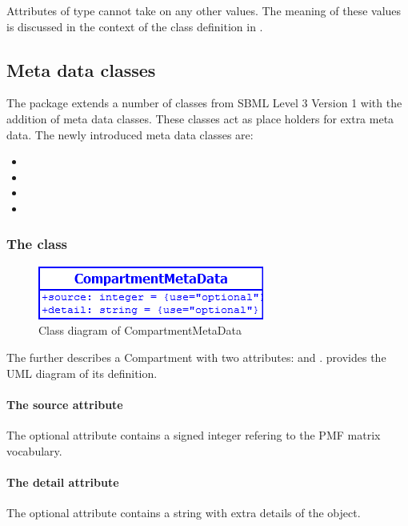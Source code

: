 Attributes of type  cannot take on any other values. The
meaning of these values is discussed in the context of the \RuleMetaData class
definition in .

\subsection{Meta data classes}
The \Pmf package extends a number of classes from SBML Level 3 Version 1 with
the addition of meta data classes. These classes act as place holders for extra
meta data. The newly introduced meta data classes are:
\begin{itemize}
	\item \CompartmentMetaData
	\item \ParameterMetaData
	\item \RuleMetaData
	\item \SpeciesMetaData
\end{itemize}


\subsubsection{The  class}
\begin{figure}
	\includegraphics[scale=0.8]{img/CompartmentMetaData}
	\caption{Class diagram of CompartmentMetaData}
	\label{CompartmentMetaData}
\end{figure}

\label{compartmentmetadata-class}
The \CompartmentMetaData further describes a Compartment with two attributes:
 and .  provides the UML
diagram of its definition.

\paragraph{The source attribute}
The optional attribute  contains a signed integer refering to the
PMF matrix vocabulary.

\paragraph{The detail attribute}
The optional attribute  contains a string with extra details of
the \Compartment object.


